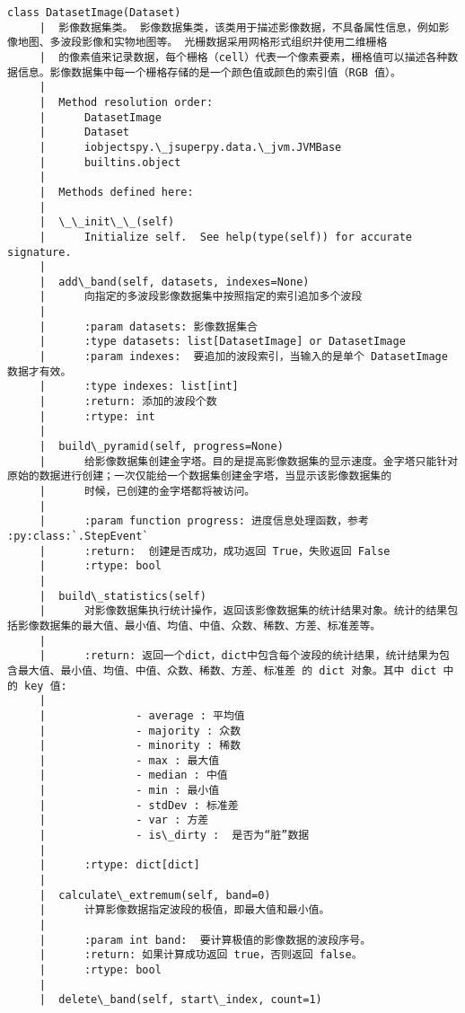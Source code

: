 \documentclass[11pt]{article}
\begin{document}
\begin{Verbatim}[commandchars=\\\{\}]
    class DatasetImage(Dataset)
     |  影像数据集类。 影像数据集类，该类用于描述影像数据，不具备属性信息，例如影像地图、多波段影像和实物地图等。 光栅数据采用网格形式组织并使用二维栅格
     |  的像素值来记录数据，每个栅格（cell）代表一个像素要素，栅格值可以描述各种数据信息。影像数据集中每一个栅格存储的是一个颜色值或颜色的索引值（RGB 值）。
     |  
     |  Method resolution order:
     |      DatasetImage
     |      Dataset
     |      iobjectspy.\_jsuperpy.data.\_jvm.JVMBase
     |      builtins.object
     |  
     |  Methods defined here:
     |  
     |  \_\_init\_\_(self)
     |      Initialize self.  See help(type(self)) for accurate signature.
     |  
     |  add\_band(self, datasets, indexes=None)
     |      向指定的多波段影像数据集中按照指定的索引追加多个波段
     |      
     |      :param datasets: 影像数据集合
     |      :type datasets: list[DatasetImage] or DatasetImage
     |      :param indexes:  要追加的波段索引，当输入的是单个 DatasetImage 数据才有效。
     |      :type indexes: list[int]
     |      :return: 添加的波段个数
     |      :rtype: int
     |  
     |  build\_pyramid(self, progress=None)
     |      给影像数据集创建金字塔。目的是提高影像数据集的显示速度。金字塔只能针对原始的数据进行创建；一次仅能给一个数据集创建金字塔，当显示该影像数据集的
     |      时候，已创建的金字塔都将被访问。
     |      
     |      :param function progress: 进度信息处理函数，参考 :py:class:`.StepEvent`
     |      :return:  创建是否成功，成功返回 True，失败返回 False
     |      :rtype: bool
     |  
     |  build\_statistics(self)
     |      对影像数据集执行统计操作，返回该影像数据集的统计结果对象。统计的结果包括影像数据集的最大值、最小值、均值、中值、众数、稀数、方差、标准差等。
     |      
     |      :return: 返回一个dict，dict中包含每个波段的统计结果，统计结果为包含最大值、最小值、均值、中值、众数、稀数、方差、标准差 的 dict 对象。其中 dict 中的 key 值:
     |      
     |              - average : 平均值
     |              - majority : 众数
     |              - minority : 稀数
     |              - max : 最大值
     |              - median : 中值
     |              - min : 最小值
     |              - stdDev : 标准差
     |              - var : 方差
     |              - is\_dirty :  是否为“脏”数据
     |      
     |      :rtype: dict[dict]
     |  
     |  calculate\_extremum(self, band=0)
     |      计算影像数据指定波段的极值，即最大值和最小值。
     |      
     |      :param int band:  要计算极值的影像数据的波段序号。
     |      :return: 如果计算成功返回 true，否则返回 false。
     |      :rtype: bool
     |  
     |  delete\_band(self, start\_index, count=1)

\end{Verbatim}
\end{document}
